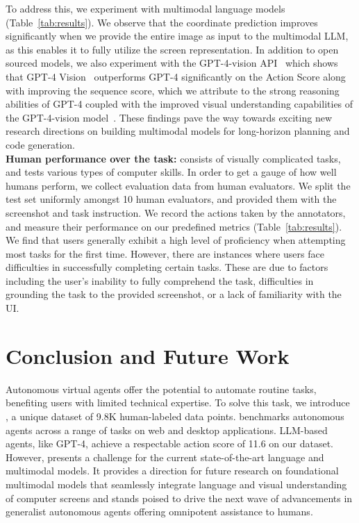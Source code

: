 To address this, we experiment with multimodal language models (Table~\ref{tab:results}). We observe that the coordinate prediction improves significantly when we provide the entire image as input to the multimodal LLM, as this enables it to fully utilize the screen representation. In addition to open sourced models, we also experiment with the GPT-4-vision API~\cite{yang2023dawn} which shows that GPT-4 Vision~\cite{yang2023dawn} outperforms GPT-4 significantly on the Action Score along with improving the sequence score, which we attribute to the strong reasoning abilities of GPT-4 coupled with the improved visual understanding capabilities of the GPT-4-vision model~\cite{yang2023dawn}. These findings pave the way towards exciting new research directions on building multimodal models for long-horizon planning and code generation. \\

\textbf{Human performance over the task:} \ModelName{} consists of visually complicated tasks, and tests various types of computer skills. In order to get a gauge of how well humans perform, we collect evaluation data from human evaluators. We split the test set uniformly amongst 10 human evaluators, and provided them with the screenshot and task instruction. We record the actions taken by the annotators, and measure their performance on our predefined metrics (Table~\ref{tab:results}). 
We find that users generally exhibit a high level of proficiency when attempting most tasks for the first time. However, there are instances where users face difficulties in successfully completing certain tasks. These are due to factors including the user's inability to fully comprehend the task, difficulties in grounding the task to the provided screenshot, or a lack of familiarity with the UI.

\section{Conclusion and Future Work}

Autonomous virtual agents offer the potential to automate routine tasks, benefiting users with limited technical expertise. To solve this task, we introduce \ModelName{}, a unique dataset of 9.8K human-labeled data points. \ModelName{} benchmarks autonomous agents across a range of tasks on web and desktop applications. 
LLM-based agents, like GPT-4, achieve a respectable action score of 11.6 on our dataset. However, \ModelName{} presents a challenge for the current state-of-the-art language and multimodal models. It provides a direction for future research on foundational multimodal models that seamlessly integrate language and visual understanding of computer screens and stands poised to drive the next wave of advancements in generalist autonomous agents offering omnipotent assistance to humans$\text{.}$

